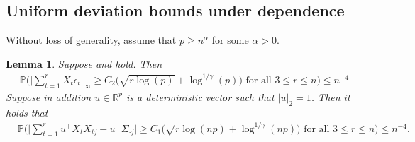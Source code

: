 \documentclass[11pt]{article}
\newcommand{\p}{\mathbb P}
\theoremstyle{plain}
\newtheorem{lemma}[theorem]{Lemma}
\theoremstyle{definition}
\begin{document}
\subsection{Uniform deviation bounds under dependence}
Without loss of generality, assume  that 
$ p\ge n^\alpha $ for some $\alpha>0$.
\begin{lemma} \label{lemma:lasso l infty deviations}
Suppose   and  hold. 
Then  
\begin{align*} 
  \p\bigg(    \bigg  |   \sum_{t =1}^r X_t \epsilon_t    \bigg |_\infty \ge C_2  \bigg( \sqrt {  r \log(p )  }  +   \log ^{1/\gamma }(p )  \bigg)   \text{ for all } 3\le r\le n  \bigg)\le n^{-4} 
 \end{align*}
Suppose in addition $u\in \mathbb R^p$ is a deterministic vector such that $ |u|_2 = 1 $.
Then it holds that 
 \begin{align*} 
 &\p\bigg(  \bigg| \sum_{t=1}^r  u^\top X_t X_{t j} - u^\top \Sigma_{ \cdot j }  \bigg|    \ge C_1  \bigg( \sqrt { r  \log(np )  }  +  \log ^{1/\gamma }(np )  \bigg)    \text{ for all } 3\le r\le n  \bigg)\le n^{-4} .
 \end{align*}  
\end{lemma}
\end{document}
